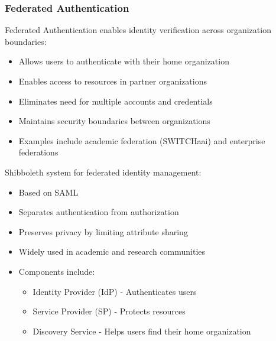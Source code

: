 \multend

\subsubsection{Federated Authentication}


\begin{definition}{Federated Authentication}
    enables identity verification across organization boundaries:
\begin{itemize}
    \item Allows users to authenticate with their home organization
    \item Enables access to resources in partner organizations
    \item Eliminates need for multiple accounts and credentials
    \item Maintains security boundaries between organizations
    \item Examples include academic federation (SWITCHaai) and enterprise federations
\end{itemize}
\end{definition}

\begin{concept}{Shibboleth}
    system for federated identity management:
\begin{itemize}
    \item Based on SAML
    \item Separates authentication from authorization
    \item Preserves privacy by limiting attribute sharing
    \item Widely used in academic and research communities
    \item Components include:
    \begin{itemize}
        \item Identity Provider (IdP) - Authenticates users
        \item Service Provider (SP) - Protects resources
        \item Discovery Service - Helps users find their home organization
    \end{itemize}
\end{itemize}
\end{concept}

